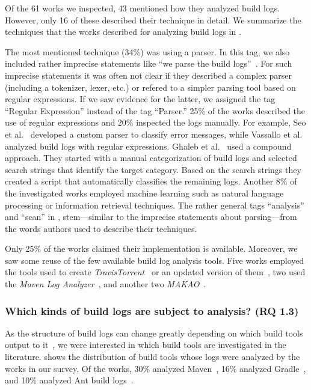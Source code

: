 Of the 61 works we inspected, 43 mentioned how they analyzed
build logs.
However, only 16 of these described their technique in detail.
We summarize the techniques that the works
described for analyzing build logs in .

The most mentioned technique (34\%) was using a parser. In this tag, we also
included
rather imprecise statements like ``we parse the build
logs''~\cite{rahman2018impact}.
For such imprecise statements it was often not clear if they described
a complex parser (including a tokenizer, lexer, etc.) or refered to a
simpler parsing tool based on regular expressions.
If we saw evidence for the latter, we assigned the tag
``Regular Expression'' instead of the tag ``Parser.''
25\% of the works described the use of regular expressions and 20\%
inspected the logs manually.
For example,
Seo et al.~\cite{seo2014programmers} developed a custom
parser to classify error messages, while Vassallo et
al.~\cite{vassallo2017a-tale} analyzed build logs with regular
expressions.
Ghaleb et al.~\cite{ghaleb2019studying} used a compound approach.
They started with a manual categorization of build logs and selected
search strings that identify the target category.
Based on the search strings they created a script that automatically
classifies the remaining logs.
Another 8\% of the investigated works
employed machine learning such as natural language
processing or information retrieval techniques.
The rather general tags ``analysis'' and ``scan'' in
, stem---similar to the imprecise
statements about parsing---from the
words authors used to describe their techniques.


Only 25\% of the works claimed their implementation is available.
Moreover, we
saw some reuse of the few available build log analysis tools.
Five works employed the tools used to create
\emph{TravisTorrent}~\cite{beller2017travistorrent,beller2017oops,
orellana2017differences,zhao2018comparing} or
an updated version of them~\cite{rott2019empirische,
shi2018evaluating}, two used the
\emph{Maven Log Analyzer}~\cite{macho2018automatically,gallaba2018noise},
and
another two
\emph{MAKAO}~\cite{wen2018blimp,adams2007design,adams2007makao}.

\subsubsection{Which kinds of build logs are subject to
  analysis? (RQ 1.3)}
As the structure of build logs can change greatly depending on which
build tools output to it~\cite{staahl2014modeling},
we were interested in which build tools are
investigated in the literature.
 shows the distribution of
build tools whose logs were analyzed by the works in our survey.
Of the works, 30\% analyzed
Maven~\cite{maven2019website},
16\% analyzed Gradle~\cite{gradle2020website},
and 10\% analyzed Ant build logs~\cite{ant2020website}.

